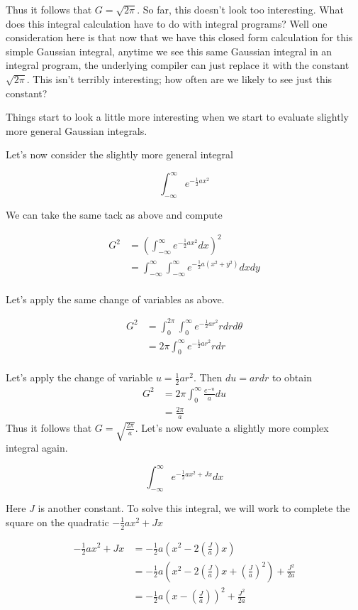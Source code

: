 \documentclass[book.tex]{subfiles}
\begin{document}
Thus it follows that $G = \sqrt{2 \pi}$. So far, this doesn't look too interesting. What does this integral calculation have to do with integral programs? Well one consideration here is that now that we have this closed form calculation for this simple Gaussian integral, anytime we see this same Gaussian integral in an integral program, the underlying compiler can just replace it with the constant $\sqrt{2 \pi}$. This isn't terribly interesting; how often are we likely to see just this constant?

Things start to look a little more interesting when we start to evaluate slightly more general Gaussian integrals.

Let's now consider the slightly more general integral

\[ \int_{-\infty}^{\infty} e^{-\frac{1}{2} ax^2} \]

We can take the same tack as above and compute

\begin{align}
    G^2 &= \left ( \int_{-\infty}^\infty e^{-\frac{1}{2}ax^2} dx \right )^2 \\
    &= \int_{-\infty}^\infty \int_{-\infty}^\infty e^{-\frac{1}{2}a(x^2 + y^2)} dx dy \\
\end{align}

Let's apply the same change of variables as above.

\begin{align}
    G^2 &= \int_{0}^{2\pi} \int_{0}^\infty e^{-\frac{1}{2}ar^2} r dr d\theta\\
    &= 2 \pi \int_{0}^\infty e^{-\frac{1}{2}ar^2} r dr \\
\end{align}

Let's  apply the change of variable $u = \frac{1}{2}ar^2$. Then $du = ar dr$ to obtain
\begin{align}
    G^2 &= 2 \pi \int_0^\infty \frac{e^{-u}}{a} du \\
    &= \frac{2 \pi}{a}
\end{align}
Thus it follows that $G = \sqrt{\frac{2\pi}{a}}$. Let's now evaluate a slightly more complex integral again.

\[ \int_{-\infty}^{\infty} e^{-\frac{1}{2}ax^2 + Jx} dx \]

Here $J$ is another constant. To solve this integral, we will work to complete the square on the quadratic $-\frac{1}{2}ax^2 + Jx$

\begin{align}
    -\frac{1}{2}ax^2 + J x &= -\frac{1}{2}a \left (x^2 -2\left (\frac{J}{a} \right ) x \right) \\
    &= -\frac{1}{2}a \left (x^2 -2\left (\frac{J}{a} \right ) x + \left ( \frac{J}{a} \right )^2 \right ) + \frac{J^2}{2a} \\
    &= -\frac{1}{2}a \left (x -\left (\frac{J}{a} \right ) \right )^2 + \frac{J^2}{2a} \\
\end{align}
\end{document}
